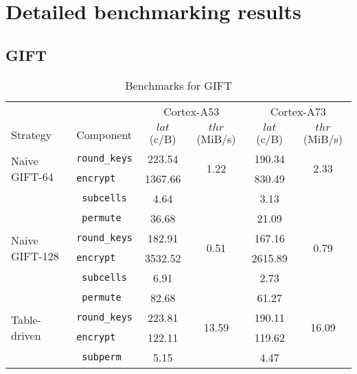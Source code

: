 \appendix
\chapter{Detailed benchmarking results}
\label{app:benchmarks}

\section{GIFT}

\begin{table}[!htbp]
    \centering
    \caption{Benchmarks for GIFT}
    \scriptsize
    \begin{tabular}{llcccc}
        \toprule
        & & \multicolumn{2}{c}{Cortex-A53} & \multicolumn{2}{c}{Cortex-A73} \\
        \cmidrule(lr){3-4}\cmidrule(lr){5-6}
        Strategy & Component & $lat$ (c/B) & $thr$ (MiB/s) & $lat$ (c/B) & $thr$ (MiB/s) \\
        \midrule
        \multirow{2}{*}{Naive GIFT-64} & \texttt{round\_keys} & 223.54 & \multirow{2}{*}{1.22} & 190.34 & \multirow{2}{*}{2.33} \\
                                                & \texttt{encrypt} & 1367.66 & &  830.49 & \\
        \cmidrule(lr){2-2}
                                                & \texttt{ subcells} & 4.64 & & 3.13 & \\
                                                & \texttt{  permute} & 36.68 & & 21.09 & \\
        \midrule
        \multirow{2}{*}{Naive GIFT-128} & \texttt{round\_keys} & 182.91 & \multirow{2}{*}{0.51} & 167.16 & \multirow{2}{*}{0.79} \\
                                                 & \texttt{encrypt} & 3532.52 & & 2615.89 & \\
        \cmidrule(lr){2-2}
                                                 & \texttt{ subcells} & 6.91 & & 2.73 & \\
                                                 & \texttt{ permute} & 82.68 & & 61.27 & \\
        \midrule
        \multirow{2}{*}{Table-driven} & \texttt{round\_keys} & 223.81 & \multirow{2}{*}{13.59} & 190.11 & \multirow{2}{*}{16.09} \\
                                      & \texttt{encrypt} & 122.11 & & 119.62 & \\
        \cmidrule(lr){2-2}
                                      & \texttt{ subperm} & 5.15 & & 4.47 & \\

\end{tabular}
\end{table}
